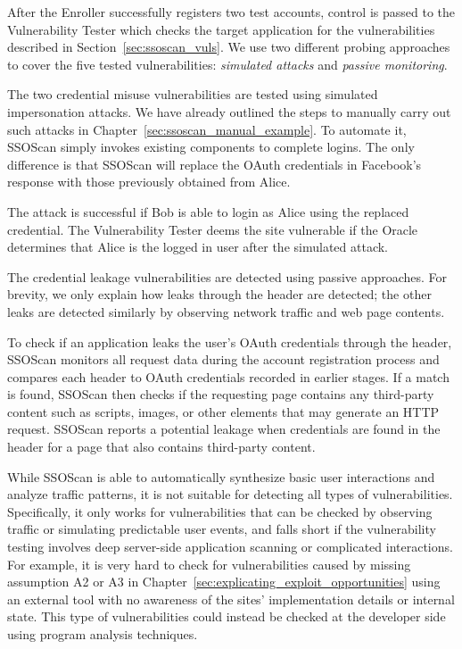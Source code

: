 After the Enroller successfully registers two test accounts, control is passed to the Vulnerability Tester which checks the target application for the vulnerabilities described in Section~\ref{sec:ssoscan_vuls}.  We use two different probing approaches to cover the five tested vulnerabilities: \emph{simulated attacks} and \emph{passive monitoring}.

 The two credential misuse vulnerabilities are tested using simulated impersonation attacks.  We have already outlined the steps to manually carry out such attacks in Chapter~\ref{sec:ssoscan_manual_example}.  To automate it, SSOScan simply invokes existing components to complete logins.  The only difference is that SSOScan will replace the OAuth credentials in Facebook's response with those previously obtained from Alice.

The attack is successful if Bob is able to login as Alice using the replaced credential.  The Vulnerability Tester deems the site vulnerable if the Oracle determines that Alice is the logged in user after the simulated attack.

  The credential leakage vulnerabilities are detected using passive approaches.  For brevity, we only explain how leaks through the  header are detected; the other leaks are detected similarly by observing network traffic and web page contents.

To check if an application leaks the user's OAuth credentials through the  header, SSOScan monitors all request data during the account registration process and compares each  header to OAuth credentials recorded in earlier stages.  If a match is found, SSOScan then checks if the requesting page contains any third-party content such as scripts, images, or other elements that may generate an HTTP request.  SSOScan reports a potential leakage when credentials are found in the  header for a page that also contains third-party content.

  While SSOScan is able to automatically synthesize basic user interactions and analyze traffic patterns, it is not suitable for detecting all types of vulnerabilities.  Specifically, it only works for vulnerabilities that can be checked by observing traffic or simulating predictable user events, and falls short if the vulnerability testing involves deep server-side application scanning or complicated interactions.  For example, it is very hard to check for vulnerabilities caused by missing assumption A2 or A3 in Chapter~\ref{sec:explicating_exploit_opportunities} using an external tool with no awareness of the sites' implementation details or internal state.  This type of vulnerabilities could instead be checked at the developer side using program analysis techniques.

